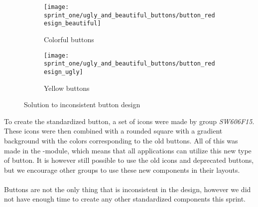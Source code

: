 \begin{figure}[!htbp]
    \centering

    \begin{subfigure}[t]{0.3\textwidth}
    	\centering
        \texttt{[image: sprint\_one/ugly\_and\_beautiful\_buttons/button\_redesign\_beautiful]}
        \caption{Colorful buttons}
        \label{fig:ugly_and_beautiful_buttons_example_one}
    \end{subfigure}
    \hspace{5em} 
    \begin{subfigure}[t]{0.3\textwidth}
    	\centering
        \texttt{[image: sprint\_one/ugly\_and\_beautiful\_buttons/button\_redesign\_ugly]}
        \caption{Yellow buttons}
        \label{fig:ugly_and_beautiful_buttons_example_two}
    \end{subfigure}
    
    \caption{Solution to inconsistent button design}
    \label{fig:ugly_and_beautiful_buttons_example_solution}
\end{figure}

To create the standardized button, a set of icons were made by group \emph{SW606F15}. These icons were then combined with a rounded square with a gradient background with the colors corresponding to the old buttons. All of this was made in the \gc-module, which means that all applications can utilize this new type of button. It is however still possible to use the old icons and deprecated buttons, but we encourage other groups to use these new components in their layouts.
\\\\
Buttons are not the only thing that is inconsistent in the design, however we did not have enough time to create any other standardized components this sprint.
